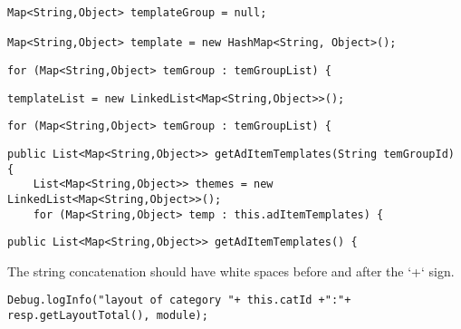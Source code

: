  \begin{lstlisting}[firstnumber=235, caption={withespace needed after comma}]
Map<String,Object> templateGroup = null;

Map<String,Object> template = new HashMap<String, Object>();
\end{lstlisting}
\noindent\makebox[\linewidth]{\rule{\linewidth}{0.4pt}}


 \begin{lstlisting}[firstnumber=244, caption={withespace needed after comma}]
for (Map<String,Object> temGroup : temGroupList) {
\end{lstlisting}
\noindent\makebox[\linewidth]{\rule{\linewidth}{0.4pt}}

  \begin{lstlisting}[firstnumber=252, caption={withespace needed after comma}]
templateList = new LinkedList<Map<String,Object>>();
\end{lstlisting}
\noindent\makebox[\linewidth]{\rule{\linewidth}{0.4pt}}

  \begin{lstlisting}[firstnumber=252, caption={withespace needed after comma}]
for (Map<String,Object> temGroup : temGroupList) {
\end{lstlisting}
\noindent\makebox[\linewidth]{\rule{\linewidth}{0.4pt}}

\begin{lstlisting}[firstnumber=283, caption={withespace needed after comma}]
public List<Map<String,Object>> getAdItemTemplates(String temGroupId) {
    List<Map<String,Object>> themes = new LinkedList<Map<String,Object>>();
    for (Map<String,Object> temp : this.adItemTemplates) {
\end{lstlisting}
\noindent\makebox[\linewidth]{\rule{\linewidth}{0.4pt}}

\begin{lstlisting}[firstnumber=342, caption={withespace needed after comma}]
public List<Map<String,Object>> getAdItemTemplates() {
\end{lstlisting}
\noindent\makebox[\linewidth]{\rule{\linewidth}{0.4pt}}

The string concatenation should have white spaces before and after the `+` sign.
\begin{lstlisting}[firstnumber=232, caption={withespace needed after comma}]
Debug.logInfo("layout of category "+ this.catId +":"+ resp.getLayoutTotal(), module);
\end{lstlisting}
\noindent\makebox[\linewidth]{\rule{\linewidth}{0.4pt}}

